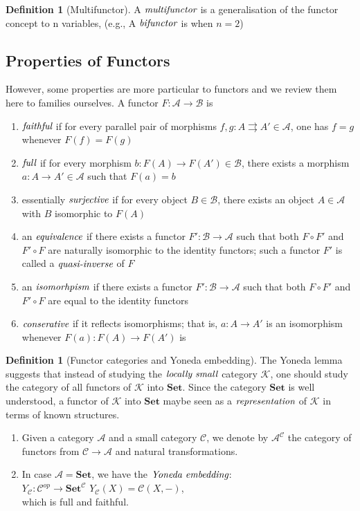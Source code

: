 \documentclass[10pt, oneside, reqno]{amsart}
\theoremstyle{plain}%
\theoremstyle{definition}
\newtheorem{defn}[thm]{Definition}
\theoremstyle{remark}
\begin{document}
\begin{defn}[Multifunctor]
 A $\emph{multifunctor}$ is a generalisation of the functor concept to n variables, (e.g., A $\emph{bifunctor}$ is when $n=2$)
\end{defn}

\subsection{Properties of Functors} %
\label{subsec:functorsproperties}
However, some properties are more particular to functors and we review them here to families ourselves.
A functor $F : \mathcal{A} \to \mathcal{B}$ is
\begin{enumerate}
 \item $\emph{faithful}$ if for every parallel pair of morphisms $f,g : A \rightrightarrows A' \in \mathcal{A}$, one has $f = g$ whenever $F(f) = F(g)$
 \item $\emph{full}$ if for every morphism $b: F(A) \to F(A') \in \mathcal{B}$, there exists a morphism $a: A \to A' \in \mathcal{A}$ such that $F(a) = b$
 \item essentially $\emph{surjective}$ if for every object $B \in \mathcal{B}$, there exists an object $A \in \mathcal{A}$ with $B$ isomorphic to $F(A)$
 \item an $\emph{equivalence}$ if there exists a functor $F': \mathcal{B} \to \mathcal{A}$ such that both $F \circ F'$ and $F' \circ F$ are naturally
 isomorphic to the identity functors; such a functor $F'$ is called a $\emph{quasi-inverse}$ of $F$
 \item an $\emph{isomorhpism}$ if there exists a functor $F': \mathcal{B} \to \mathcal{A}$ such that both $F \circ F'$ and $F' \circ F$
 are equal to the identity functors
 \item $\emph{conserative}$ if it reflects isomorphisms; that is, $a: A \to A'$ is an isomorphism whenever $F(a): F(A) \to F(A')$ is
\end{enumerate}

\begin{defn}[Functor categories and Yoneda embedding]
The Yoneda lemma suggests that instead of studying the $\emph{locally small}$ category $\mathcal{K}$,
one should study the category of all functors of $\mathcal{K}$ into $\textbf{Set}$.
Since the category $\textbf{Set}$ is well understood, a functor of $\mathcal{K}$ into $\textbf{Set}$
maybe seen as a $\emph{representation}$ of $\mathcal{K}$ in terms of known structures. 
 \begin{enumerate}
  \item Given a category $\mathcal{A}$ and a small category $\mathcal{C}$, we denote by
  $\mathcal{A}^\mathcal{C}$ the category of functors from $\mathcal{C} \to \mathcal{A}$ and natural transformations.
  \item In case $\mathcal{A} = \textbf{Set}$, we have the $\emph{Yoneda embedding}$:\\
  $Y_{\mathcal{C}}: \mathcal{C}^{op} \to \textbf{Set}^{\mathcal{C}}
  \, \,
  Y_{\mathcal{C}}(X) = \mathcal{C}(X, -)$,\\
  which is full and faithful.
 \end{enumerate}
\end{defn}
\end{document}
